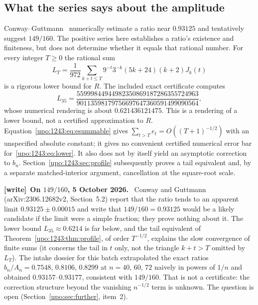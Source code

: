\documentclass[11pt,letterpaper]{article}
\theoremstyle{remark}\newtheorem{remark}[theorem]{Remark}
\numberwithin{equation}{section}
\newenvironment{writenote}[1][]{\par\smallskip\begingroup\small
 \noindent\textbf{[write]}\if\relax\detokenize{#1}\relax\else~\textbf{#1.}\fi\ }%
 {\par\endgroup\smallskip}
\begin{document}
\subsection*{What the series says about the amplitude}
Conway--Guttmann~\cite[Section 5.2, printed pages 20--23]{CG} numerically
estimate a ratio near $0.93125$ and tentatively suggest $149/160$.
The positive series here establishes a ratio's existence and finiteness,
but does not determine whether it equals that rational number.
For every integer $T\ge0$ the rational sum
\begin{equation}\label{upo:1243:eq:lower}
 L_T=\frac1{972}\sum_{k+t\le T}
 9^{-t}3^{-k}(5k+24)(k+2)J_k(t)
\end{equation}
is a rigorous lower bound for $R$. The included exact certificate
computes
\[
 L_{35}=\frac{55999844944982350869187286355724963}
                 {90113598179756697647360591499090564},
\]
whose numerical rendering is about $0.621436121475$.
This is a rendering of a lower bound, not a certified approximation to
$R$. Equation~\eqref{upo:1243:eq:esummable} gives
$\sum_{t>T}e_t=O((T+1)^{-1/2})$ with an unspecified absolute constant;
it gives no convenient certified numerical error bar for~\eqref{upo:1243:eq:lower}.
It also does not by itself yield an asymptotic correction to $b_n$.
Section~\ref{upo:1243:sec:profile} subsequently proves a tail equivalent and,
by a separate matched-interior argument, cancellation at the square-root
scale.
\begin{writenote}[On $149/160$, 5 October 2026]
Conway and Guttmann (arXiv:2306.12682v2, Section~5.2) report that the ratio tends to an apparent limit $0.93125\pm0.00015$ and write that $149/160=0.93125$ would be a likely candidate if the limit were a simple fraction; they prove nothing about it. The lower bound $L_{35}\approx0.6214$ is far below, and the tail equivalent of Theorem~\ref{upo:1243:thm:profile}, of order $T^{-1/2}$, explains the slow convergence of finite sums (it concerns the tail in $t$ only, not the triangle $k+t>T$ omitted by $L_T$). The intake dossier for this batch extrapolated the exact ratios $b_n/A_n=0.7548$, $0.8106$, $0.8299$ at $n=40$, $60$, $72$ naively in powers of $1/n$ and obtained $0.93157$--$0.93177$, consistent with $149/160$. That is not a certificate: the correction structure beyond the vanishing $n^{-1/2}$ term is unknown. The question is open (Section~\ref{upo:sec:further}, item~2).
\end{writenote}
\end{document}
